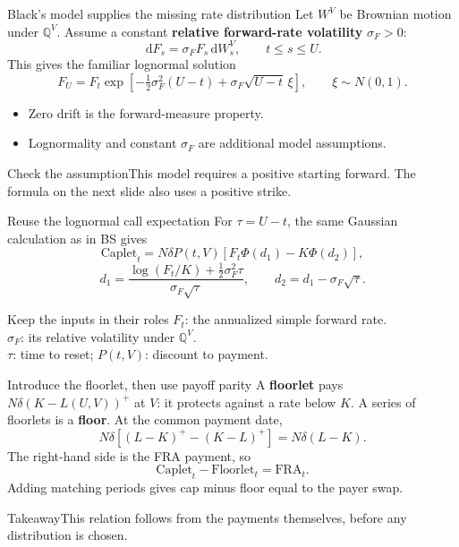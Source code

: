 \documentclass[handout,10pt,t,aspectratio=169]{beamer}
\newenvironment{keybox}{\begin{exampleblock}{Takeaway}}{\end{exampleblock}}
\newenvironment{watchbox}{\begin{alertblock}{Check the assumption}}{\end{alertblock}}
\newcommand{\Q}{\mathbb Q}
\newcommand{\dd}{\,\mathrm d}
\begin{document}
\begin{frame}{Black's model supplies the missing rate distribution}
Let \(W^V\) be Brownian motion under \(\Q^V\). Assume a constant
\textbf{relative forward-rate volatility} \(\sigma_F>0\):
\[
 \dd F_s=\sigma_F F_s\dd W_s^V,\qquad t\leq s\leq U.
\]
This gives the familiar lognormal solution
\[
 F_U=F_t\exp\!\left[-\tfrac12\sigma_F^2(U-t)
              +\sigma_F\sqrt{U-t}\,\xi\right],\qquad \xi\sim N(0,1).
\]
\begin{itemize}
\item Zero drift is the forward-measure property.
\item Lognormality and constant \(\sigma_F\) are additional model assumptions.
\end{itemize}
\begin{watchbox}This model requires a positive starting forward.
The formula on the next slide also uses a positive strike.\end{watchbox}
\end{frame}

\begin{frame}{Reuse the lognormal call expectation}
For \(\tau=U-t\), the same Gaussian calculation as in BS gives
\[
 \boxed{\mathrm{Caplet}_t=N\delta P(t,V)
 [F_t\Phi(d_1)-K\Phi(d_2)],}
\]
\[
 d_1=\frac{\log(F_t/K)+\tfrac12\sigma_F^2\tau}{\sigma_F\sqrt\tau},
 \qquad d_2=d_1-\sigma_F\sqrt\tau.
\]
\begin{block}{Keep the inputs in their roles}
\(F_t\): the annualized simple forward rate.\\
\(\sigma_F\): its relative volatility under \(\Q^V\).\\
\(\tau\): time to reset; \quad \(P(t,V)\): discount to payment.
\end{block}
\end{frame}

\begin{frame}{Introduce the floorlet, then use payoff parity}
\small
A \textbf{floorlet} pays \(N\delta(K-L(U,V))^+\) at \(V\):
it protects against a rate below \(K\). A series of floorlets is a \textbf{floor}.
At the common payment date,
\[
 N\delta[(L-K)^+-(K-L)^+]=N\delta(L-K).
\]
The right-hand side is the FRA payment, so
\[
 \boxed{\mathrm{Caplet}_t-\mathrm{Floorlet}_t=\mathrm{FRA}_t.}
\]
Adding matching periods gives cap minus floor equal to the payer swap.
\begin{keybox}This relation follows from the payments themselves, before any distribution is chosen.\end{keybox}
\end{frame}
\end{document}
